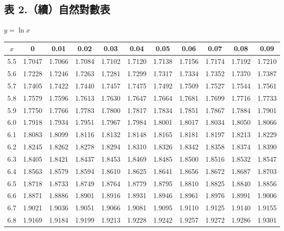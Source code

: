 \clearpage

\subsection*{表 2.\quad （續）自然對數表}
\begin{center} $y = \ln x$ \end{center}
{\centering\fontsize{7.5pt}{8.8pt}\selectfont\setlength{\tabcolsep}{3.5pt}\renewcommand{\arraystretch}{0.96}
\begin{tabular}{|c|cccccccccc|}
\hline
$x$ & 0 & 0.01 & 0.02 & 0.03 & 0.04 & 0.05 & 0.06 & 0.07 & 0.08 & 0.09 \\ \hline
5.5 & 1.7047 & 1.7066 & 1.7084 & 1.7102 & 1.7120 & 1.7138 & 1.7156 & 1.7174 & 1.7192 & 1.7210 \\
5.6 & 1.7228 & 1.7246 & 1.7263 & 1.7281 & 1.7299 & 1.7317 & 1.7334 & 1.7352 & 1.7370 & 1.7387 \\
5.7 & 1.7405 & 1.7422 & 1.7440 & 1.7457 & 1.7475 & 1.7492 & 1.7509 & 1.7527 & 1.7544 & 1.7561 \\
5.8 & 1.7579 & 1.7596 & 1.7613 & 1.7630 & 1.7647 & 1.7664 & 1.7681 & 1.7699 & 1.7716 & 1.7733 \\
5.9 & 1.7750 & 1.7766 & 1.7783 & 1.7800 & 1.7817 & 1.7834 & 1.7851 & 1.7867 & 1.7884 & 1.7901 \\
\hline
6.0 & 1.7918 & 1.7934 & 1.7951 & 1.7967 & 1.7984 & 1.8001 & 1.8017 & 1.8034 & 1.8050 & 1.8066 \\
6.1 & 1.8083 & 1.8099 & 1.8116 & 1.8132 & 1.8148 & 1.8165 & 1.8181 & 1.8197 & 1.8213 & 1.8229 \\
6.2 & 1.8245 & 1.8262 & 1.8278 & 1.8294 & 1.8310 & 1.8326 & 1.8342 & 1.8358 & 1.8374 & 1.8390 \\
6.3 & 1.8405 & 1.8421 & 1.8437 & 1.8453 & 1.8469 & 1.8485 & 1.8500 & 1.8516 & 1.8532 & 1.8547 \\
6.4 & 1.8563 & 1.8579 & 1.8594 & 1.8610 & 1.8625 & 1.8641 & 1.8656 & 1.8672 & 1.8687 & 1.8703 \\
\hline
6.5 & 1.8718 & 1.8733 & 1.8749 & 1.8764 & 1.8779 & 1.8795 & 1.8810 & 1.8825 & 1.8840 & 1.8856 \\
6.6 & 1.8871 & 1.8886 & 1.8901 & 1.8916 & 1.8931 & 1.8946 & 1.8961 & 1.8976 & 1.8991 & 1.9006 \\
6.7 & 1.9021 & 1.9036 & 1.9051 & 1.9066 & 1.9081 & 1.9095 & 1.9110 & 1.9125 & 1.9140 & 1.9155 \\
6.8 & 1.9169 & 1.9184 & 1.9199 & 1.9213 & 1.9228 & 1.9242 & 1.9257 & 1.9272 & 1.9286 & 1.9301 \\

\end{tabular}}
